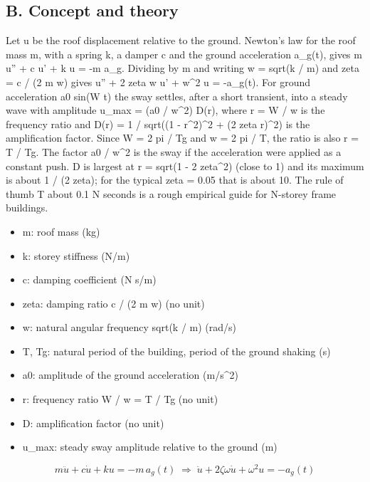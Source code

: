 \documentclass[11pt,a4paper]{article}
\begin{document}
\subsection*{B. Concept and theory}
Let u be the roof displacement relative to the ground. Newton's law for the roof mass m, with a spring k, a damper c and the ground acceleration a\_g(t), gives m u'' + c u' + k u = -m a\_g. Dividing by m and writing w = sqrt(k / m) and zeta = c / (2 m w) gives u'' + 2 zeta w u' + w\textasciicircum{}2 u = -a\_g(t). For ground acceleration a0 sin(W t) the sway settles, after a short transient, into a steady wave with amplitude u\_max = (a0 / w\textasciicircum{}2) D(r), where r = W / w is the frequency ratio and D(r) = 1 / sqrt((1 - r\textasciicircum{}2)\textasciicircum{}2 + (2 zeta r)\textasciicircum{}2) is the amplification factor. Since W = 2 pi / Tg and w = 2 pi / T, the ratio is also r = T / Tg. The factor a0 / w\textasciicircum{}2 is the sway if the acceleration were applied as a constant push. D is largest at r = sqrt(1 - 2 zeta\textasciicircum{}2) (close to 1) and its maximum is about 1 / (2 zeta); for the typical zeta = 0.05 that is about 10. The rule of thumb T about 0.1 N seconds is a rough empirical guide for N-storey frame buildings.

\begin{itemize}[nosep]
\item m: roof mass (kg)
\item k: storey stiffness (N/m)
\item c: damping coefficient (N s/m)
\item zeta: damping ratio c / (2 m w) (no unit)
\item w: natural angular frequency sqrt(k / m) (rad/s)
\item T, Tg: natural period of the building, period of the ground shaking (s)
\item a0: amplitude of the ground acceleration (m/s\textasciicircum{}2)
\item r: frequency ratio W / w = T / Tg (no unit)
\item D: amplification factor (no unit)
\item u\_max: steady sway amplitude relative to the ground (m)
\end{itemize}

\begin{equation*}
m\ddot u+c\dot u+ku=-m\,a_g(t)\;\Longrightarrow\;\ddot u+2\zeta\omega\dot u+\omega^2u=-a_g(t)
\end{equation*}
\end{document}
